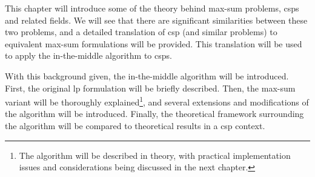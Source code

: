 This chapter will introduce some of the theory behind max-sum problems, \glspl{csp} and related fields.
We will see that there are significant similarities between these two problems, and a detailed translation of \gls{csp} (and similar problems) to equivalent max-sum formulations will be provided.
This translation will be used to apply the in-the-middle algorithm to \glspl{csp}.

With this background given, the in-the-middle algorithm will be introduced. First, the original \gls{lp} formulation will be briefly described.
Then, the max-sum variant will be thoroughly explained\footnote{The algorithm will be described in theory, with practical implementation issues and considerations being discussed in the next chapter.}, and several extensions and modifications of the algorithm will be introduced.
Finally, the theoretical framework surrounding the algorithm will be compared to theoretical results in a \gls{csp} context.
